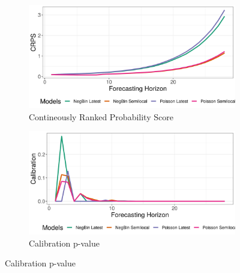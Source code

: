 \begin{figure}[H]
\begin{subfigure}{0.5\textwidth}
  \centering
  \includegraphics[width=\linewidth]{../output/Kyondo_crps.png}  
  \caption{Contineously Ranked Probability Score}
  \label{Kyondo_scores_1}
\end{subfigure}
\begin{subfigure}{0.5\textwidth}
  \centering
  \includegraphics[width=\linewidth]{../output/Kyondo_calibration.png}  
  \caption{Calibration p-value}
  \label{Kyondo_scores_2}
\end{subfigure}


\end{figure}
